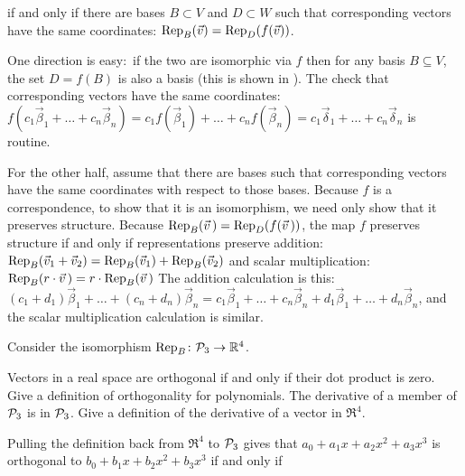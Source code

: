 \begin{exercises}
    if and only if there are bases \( B\subset V \)
    and \( D\subset W \) such that corresponding vectors have the same
    coordinates:
    \( \rep{\vec{v}}{B}=\rep{f(\vec{v})}{D} \).
    \begin{answer}
       One direction is easy:~if the two are isomorphic via \( f \)
       then for any basis \( B\subseteq V \),
       the set \( D=f(B) \) is also a basis (this is shown in
       ).
       The check that corresponding vectors have the same coordinates:
       \( f(c_1\vec{\beta}_1+\dots+c_n\vec{\beta}_n)
          =c_1f(\vec{\beta}_1)+\dots+c_nf(\vec{\beta}_n)
          =c_1\vec{\delta}_1+\dots+c_n\vec{\delta}_n   \)
       is routine.

       For the other half, assume that there are bases such that corresponding
       vectors have the same coordinates with respect to those bases.
       Because \( f \) is a correspondence, to show that it is an isomorphism,
       we need only show that it preserves structure.
       Because \( \rep{\vec{v}\,}{B}=\rep{f(\vec{v}\,)}{D} \), the
       map \( f \) preserves structure if and only if
       representations preserve addition:
       \( \rep{\vec{v}_1+\vec{v}_2}{B}=\rep{\vec{v}_1}{B}+\rep{\vec{v}_2}{B} \)
       and scalar multiplication: 
       \( \rep{r\cdot\vec{v}\,}{B}=r\cdot\rep{\vec{v}\,}{B} \)
       The addition calculation is this:
       \( (c_1+d_1)\vec{\beta}_1+\dots+(c_n+d_n)\vec{\beta}_n
          =c_1\vec{\beta}_1+\dots+c_n\vec{\beta}_n
          +d_1\vec{\beta}_1+\dots+d_n\vec{\beta}_n \),
       and the scalar multiplication calculation is similar.
     \end{answer}
  \item 
    Consider the isomorphism \( \map{\text{Rep}_B}{\polyspace_3}{\Re^4} \).
    \begin{exparts}
      \partsitem Vectors in a real space are orthogonal if and only if
        their dot product is zero.
        Give a definition of orthogonality for polynomials.
      \partsitem The derivative of a member of \( \polyspace_3 \) is in
        \( \polyspace_3 \).
        Give a definition of the derivative of a vector in \( \Re^4 \).
    \end{exparts}
    \begin{answer}
       \begin{exparts}
        \partsitem Pulling the definition back from 
          \( \Re^4 \) to \( \polyspace_3 \)
          gives that \( a_0+a_1x+a_2x^2+a_3x^3 \) is orthogonal to
          \( b_0+b_1x+b_2x^2+b_3x^3 \) if and only if

\end{exparts}
\end{answer}
\end{exercises}
